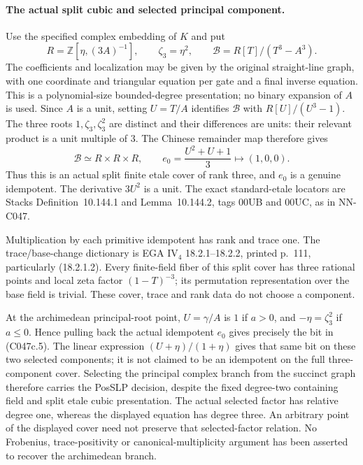 \begin{geometricstatement}[NN-C047]
\paragraph{The actual split cubic and selected principal component.}
Use the specified complex embedding of $K$ and put
\[
 R=\mathbb Z[\eta,(3A)^{-1}],\qquad
 \zeta_3=\eta^2,\qquad
 \mathcal B=R[T]/(T^3-A^3).
 \tag{C047c.7}
\]
The coefficients and localization may be given by the original
straight-line graph, with one coordinate and triangular equation
per gate and a final inverse equation. This is a polynomial-size
bounded-degree presentation; no binary expansion of $A$ is used.
Since $A$ is a unit, setting $U=T/A$ identifies
$\mathcal B$ with $R[U]/(U^3-1)$.
The three roots $1,\zeta_3,\zeta_3^2$ are distinct and their
differences are units: their relevant product is a unit multiple
of $3$. The Chinese remainder map therefore gives
\[
                  \mathcal B\simeq R\times R\times R,
 \qquad
                  e_0=\frac{U^2+U+1}{3}\longmapsto(1,0,0).
 \tag{C047c.8}
\]
Thus this is an actual split finite etale cover of rank three,
and $e_0$ is a genuine idempotent. The derivative $3U^2$ is
a unit. The exact standard-etale locators are Stacks
Definition~10.144.1 and Lemma~10.144.2, tags 00UB and 00UC,
as in NN-C047.

Multiplication by each primitive idempotent has rank and
trace one. The trace/base-change dictionary is EGA IV$_4$
18.2.1--18.2.2, printed p.~111, particularly (18.2.1.2).
Every finite-field fiber of this split cover has three
rational points and local zeta factor $(1-T)^{-3}$;
its permutation representation over the base field is trivial.
These cover, trace and rank data do not choose a component.

At the archimedean principal-root point,
$U=\gamma/A$ is $1$ if $a>0$, and
$-\eta=\zeta_3^2$ if $a\le0$.
Hence pulling back the actual idempotent $e_0$ gives precisely
the bit in (C047c.5). The linear expression
$(U+\eta)/(1+\eta)$ gives that same bit on these two selected
components; it is not claimed to be an idempotent on the full
three-component cover.
Selecting the principal complex branch from the succinct graph
therefore carries the PosSLP decision, despite the fixed
degree-two containing field and split etale cubic presentation.
The actual selected factor has relative degree one, whereas
the displayed equation has degree three. An arbitrary point
of the displayed cover need not preserve that selected-factor
relation. No Frobenius, trace-positivity or canonical-multiplicity
argument has been asserted to recover the archimedean branch.


\end{geometricstatement}
